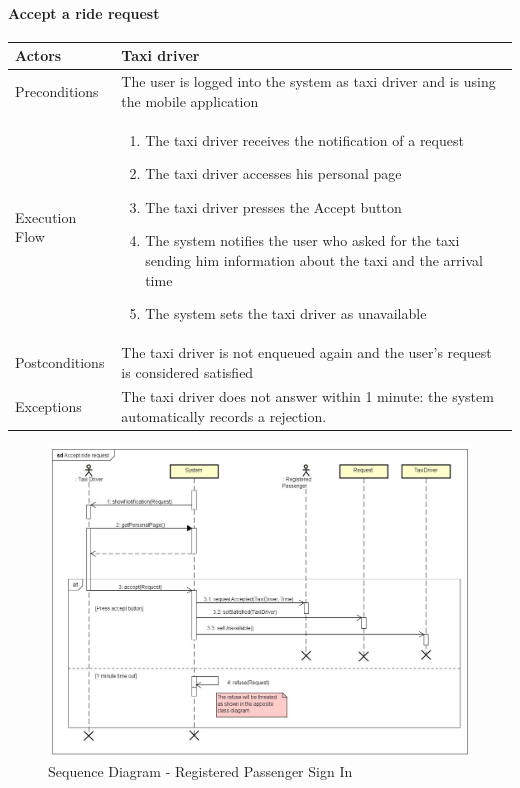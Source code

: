 \paragraph{Accept a ride request}
\begin{center}
	\begin{tabular}{ | l | p{8cm} |}
		\hline Actors & Taxi driver
		\\ \hline
		Preconditions &
		The user is logged into the system as taxi driver and is using the mobile application
		\\ \hline
		Execution Flow &
		\begin{enumerate}
			\item The taxi driver receives the notification of a request
			\item The taxi driver accesses his personal page
			\item The taxi driver presses the Accept button
			\item The system notifies the user who asked for the taxi sending him
			information about the taxi and the arrival time
			\item The system sets the taxi driver as unavailable
		\end{enumerate}
		\\ \hline
		Postconditions & The taxi driver is not enqueued again and the user's request
		is considered satisfied
		\\ \hline
		Exceptions &
		The taxi driver does not answer within 1 minute:
		the system automatically records a rejection.
		\\ \hline
	\end{tabular}
\end{center}
\newpage
\begin{landscape}
\begin{figure}[!h]
	\begin{center}			
		\includegraphics[height=\textheight]{../SE2_SD/AcceptRideRequest}
		\caption{Sequence Diagram - Registered Passenger Sign In}	
	\end{center}
\end{figure}
\end{landscape}
\newpage
